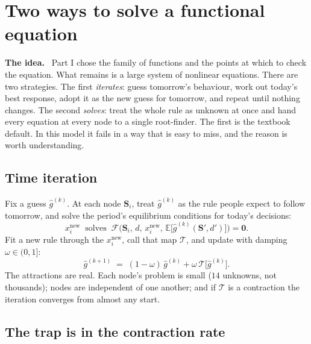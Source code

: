 \documentclass[10pt,a4paper]{article}
\newenvironment{idea}{\begin{shaded}\noindent\textbf{The idea.}\ }{\end{shaded}}
\theoremstyle{plain}
\theoremstyle{remark}
\newcommand{\E}{\mathbb{E}}
\newcommand{\st}{\mathbf{S}}
\begin{document}
\section{Two ways to solve a functional equation}
\label{sec:paradigms}

\begin{idea}
Part I chose the family of functions and the points at which to check the equation. What
remains is a large system of nonlinear equations. There are two strategies. The first
\emph{iterates}: guess tomorrow's behaviour, work out today's best response, adopt it as the
new guess for tomorrow, and repeat until nothing changes. The second \emph{solves}: treat the
whole rule as unknown at once and hand every equation at every node to a single root-finder.
The first is the textbook default. In this model it fails in a way that is easy to miss, and
the reason is worth understanding.
\end{idea}

\subsection{Time iteration}

Fix a guess $\hat g^{(k)}$. At each node $\st_i$, treat $\hat g^{(k)}$ as the rule people
expect to follow tomorrow, and solve the period's equilibrium conditions for today's
decisions:
\begin{equation}
  x_i^{\text{new}}\ \text{ solves }\ \mathcal F\Big(\st_i,\,d,\,x_i^{\text{new}},\,
  \E\big[\hat g^{(k)}(\st',d')\big]\Big) = \bm 0 .
\end{equation}
Fit a new rule through the $x_i^{\text{new}}$, call that map $\mathcal T$, and update with
damping $\omega\in(0,1]$:
\begin{equation}
  \hat g^{(k+1)} \;=\; (1-\omega)\,\hat g^{(k)} + \omega\,\mathcal{T}\big[\hat g^{(k)}\big].
  \label{eq:ti}
\end{equation}
The attractions are real. Each node's problem is small ($14$ unknowns, not thousands); nodes
are independent of one another; and if $\mathcal T$ is a contraction the iteration converges
from almost any start.

\subsection{The trap is in the contraction rate}
\end{document}
